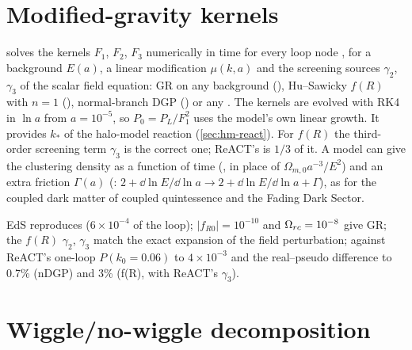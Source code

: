 \section{Modified-gravity kernels}\label{sec:pt-mg}

 solves the kernels $F_1$, $F_2$, $F_3$ numerically in time for every loop node
\cite{KoyamaTaruyaHiramatsu2009,BoseKoyama2016}, for a background $E(a)$, a linear modification $\mu(k,a)$ and the
screening sources $\gamma_2$, $\gamma_3$ of the scalar field equation: GR on any background (), Hu--Sawicky
$f(R)$ with $n=1$ (), normal-branch DGP () or any . The kernels are
evolved with RK4 in $\ln a$ from $a=10^{-5}$, so $P_0=P_L/F_1^2$ uses the model's own linear growth. It provides $k_*$ of
the halo-model reaction (\cref{sec:hm-react}). For $f(R)$ the third-order screening term $\gamma_3$ is the correct one;
ReACT's is $1/3$ of it. A model can give the clustering density as a function of time (, in place of
$\Omega_{m,0}a^{-3}/E^2$) and an extra friction $\Gamma(a)$ (: $2+\dd\ln E/\dd\ln a\to2+\dd\ln E/\dd\ln a+\Gamma$),
as for the coupled dark matter of coupled quintessence and the Fading Dark Sector.

\begin{validation}
EdS reproduces  ($6\times10^{-4}$ of the loop); $|f_{R0}|=10^{-10}$ and $\Omega_{rc}=10^{-8}$ give GR; the
$f(R)$ $\gamma_2$, $\gamma_3$ match the exact expansion of the field perturbation; against ReACT's one-loop $P(k_0=0.06)$ to
$4\times10^{-3}$ and the real--pseudo difference to 0.7\% (nDGP) and 3\% (f(R), with ReACT's $\gamma_3$).
\end{validation}

\section{Wiggle/no-wiggle decomposition}\label{sec:pt-nowiggle}

